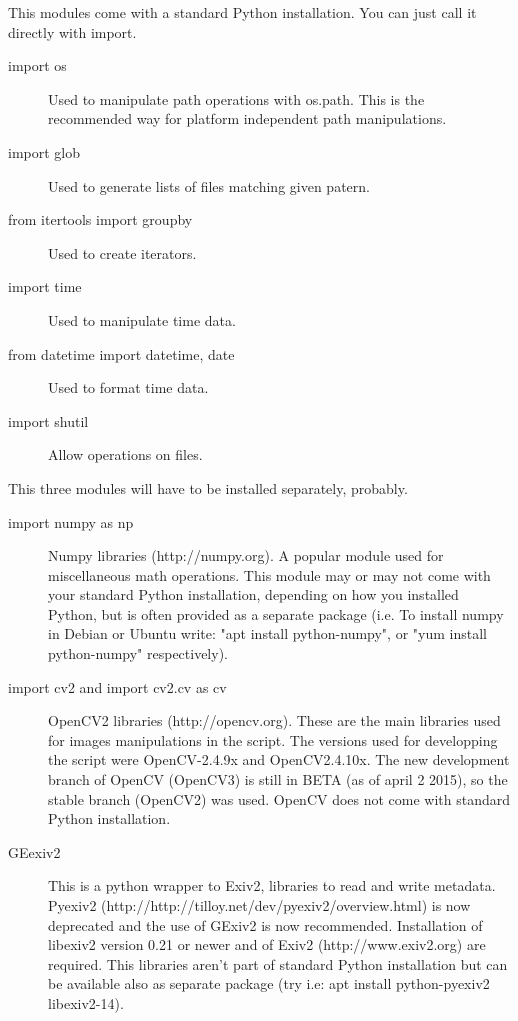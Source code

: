 \documentclass[a4paper, 11pt]{article}
\begin{document}
\begin{description}
\item This modules come with a standard Python installation. You can just call it directly with import.

 \begin{description}
\item [import os] Used to manipulate path operations with os.path. This is the recommended way for platform independent path manipulations. %
\item [import glob] Used to generate lists of files matching given patern. %
\item [from itertools import groupby] Used to create iterators. %
\item [import time] Used to manipulate time data. %
\item [from datetime import datetime, date] Used to format time data. %
\item [import shutil] Allow operations on files.
\end{description}

\item This three modules will have to be installed separately, probably.

  \begin{description}
\item [import numpy as np] Numpy libraries (http://numpy.org). A popular module used for miscellaneous math operations. This module may or may not come with your standard Python installation, depending on how you installed Python, but is often provided as a separate package (i.e. To install numpy in Debian or Ubuntu write: "apt install python-numpy", or "yum install python-numpy" respectively).

\item [import cv2 and import cv2.cv as cv] OpenCV2 libraries (http://opencv.org). These are the main libraries used for images manipulations in the script. The versions used for developping the script were OpenCV-2.4.9x and OpenCV2.4.10x. The new development branch of OpenCV (OpenCV3) is still in BETA (as of april 2 2015), so the stable branch (OpenCV2) was used. OpenCV does not come with standard Python installation.

\item [GEexiv2] This is a python wrapper to Exiv2, libraries to read and write metadata. Pyexiv2 (http://http://tilloy.net/dev/pyexiv2/overview.html) is now deprecated and the use of GExiv2 is now recommended. Installation of libexiv2 version 0.21 or newer and of Exiv2 (http://www.exiv2.org) are required. This libraries aren't part of standard Python installation but can be available also as separate package (try i.e: apt install python-pyexiv2 libexiv2-14). 
  \end{description}
\end{description}
\end{document}
